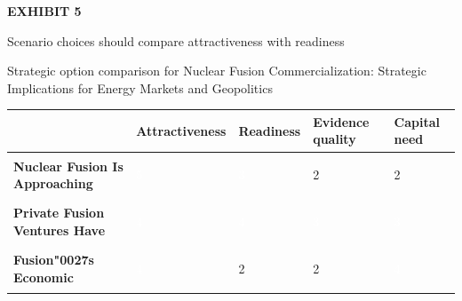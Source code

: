 \documentclass[10pt,a4paper]{article}
\newcommand{\BOApos}{{\BOQuoteFont\char"0027}}
\begin{document}
\clearpage
{\textcolor{BOGreen}{\scriptsize\bfseries EXHIBIT 5}}\par\vspace{3pt}
{\sffamily\fontsize{15}{19}\selectfont\color{BONavy} Scenario choices should compare attractiveness with readiness}\par
{\small\color{BOText} Strategic option comparison for Nuclear Fusion Commercialization: Strategic Implications for Energy Markets and Geopolitics}\par\vspace{4pt}
{\scriptsize\begin{tabular}{p{38mm}>{\centering\arraybackslash}p{21mm}>{\centering\arraybackslash}p{21mm}>{\centering\arraybackslash}p{21mm}>{\centering\arraybackslash}p{21mm}}
 & {\bfseries Attractiveness} & {\bfseries Readiness} & {\bfseries Evidence quality} & {\bfseries Capital need} \\
\hline
{\bfseries Nuclear Fusion Is Approaching} & \colorbox{BOGreen}{\textcolor{white}{\strut\hspace{5pt}5\hspace{5pt}}} & \colorbox{BOBlue}{\textcolor{white}{\strut\hspace{5pt}3\hspace{5pt}}} & \colorbox{BOLight}{\textcolor{BOText}{\strut\hspace{5pt}2\hspace{5pt}}} & \colorbox{BOLight}{\textcolor{BOText}{\strut\hspace{5pt}2\hspace{5pt}}} \\
{\bfseries Private Fusion Ventures Have} & \colorbox{BOGreen}{\textcolor{white}{\strut\hspace{5pt}4\hspace{5pt}}} & \colorbox{BOGreen}{\textcolor{white}{\strut\hspace{5pt}4\hspace{5pt}}} & \colorbox{BOBlue}{\textcolor{white}{\strut\hspace{5pt}3\hspace{5pt}}} & \colorbox{BOBlue}{\textcolor{white}{\strut\hspace{5pt}3\hspace{5pt}}} \\
{\bfseries Fusion\BOApos{}s Economic} & \colorbox{BOGreen}{\textcolor{white}{\strut\hspace{5pt}4\hspace{5pt}}} & \colorbox{BOLight}{\textcolor{BOText}{\strut\hspace{5pt}2\hspace{5pt}}} & \colorbox{BOLight}{\textcolor{BOText}{\strut\hspace{5pt}2\hspace{5pt}}} & \colorbox{BOGreen}{\textcolor{white}{\strut\hspace{5pt}4\hspace{5pt}}} \\

\end{tabular}}
\end{document}
